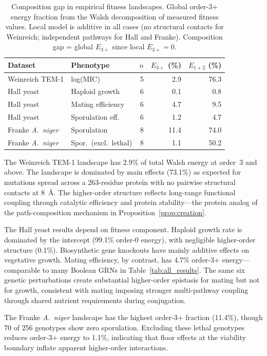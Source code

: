 \documentclass[10pt]{article}
\begin{document}
\begin{table}[t]
\centering
\caption{Composition gap in empirical fitness landscapes. Global
order-3+ energy fraction from the Walsh decomposition of measured
fitness values. Local model is additive in all cases (no structural
contacts for Weinreich; independent pathways for Hall and Franke).
Composition gap = global $E_{3+}$ since local $E_{3+} = 0$.}
\label{tab:empirical}
\begin{tabular}{llrrr}
\toprule
Dataset & Phenotype & $n$ & $E_{3+}$ (\%) & $E_{1+2}$ (\%) \\
\midrule
Weinreich TEM-1 & log(MIC) & 5 & 2.9 & 76.3 \\
Hall yeast & Haploid growth & 6 & 0.1 & 0.8 \\
Hall yeast & Mating efficiency & 6 & 4.7 & 9.5 \\
Hall yeast & Sporulation eff. & 6 & 1.2 & 4.7 \\
Franke \emph{A.~niger} & Sporulation & 8 & 11.4 & 74.0 \\
Franke \emph{A.~niger} & Spor.\ (excl.\ lethal) & 8 & 1.1 & 50.2 \\
\bottomrule
\end{tabular}
\end{table}

The Weinreich TEM-1 landscape has 2.9\% of total Walsh energy at
order~3 and above. The landscape is dominated by main effects
(73.1\%) as expected for mutations spread across a 263-residue
protein with no pairwise structural contacts at 8~\AA. The
higher-order structure reflects long-range functional coupling
through catalytic efficiency and protein stability---the protein
analog of the path-composition mechanism in
Proposition~\ref{prop:creation}.

The Hall yeast results depend on fitness component. Haploid growth
rate is dominated by the intercept (99.1\% order-0 energy), with
negligible higher-order structure (0.1\%). Biosynthetic gene
knockouts have mainly additive effects on vegetative growth. Mating efficiency, by
contrast, has 4.7\% order-3+ energy---comparable to many Boolean
GRNs in Table~\ref{tab:all_results}. The same six genetic
perturbations create substantial higher-order epistasis for mating
but not for growth, consistent with mating imposing stronger
multi-pathway coupling through shared nutrient requirements during
conjugation.

The Franke \emph{A.~niger} landscape has the highest order-3+
fraction (11.4\%), though 70 of 256 genotypes show zero sporulation.
Excluding these lethal genotypes reduces order-3+ energy to 1.1\%,
indicating that floor effects at the viability boundary inflate
apparent higher-order interactions.
\end{document}
